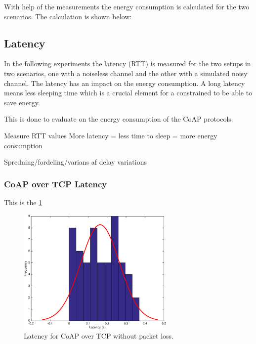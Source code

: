 With help of the measurements the energy consumption is calculated for the two scenarios. The calculation is shown below:

\subsection{Latency}
In the following experiments the latency (RTT) is measured for the two setups in two scenarios, one with a noiseless channel and the other with a simulated noisy channel. The latency has an impact on the energy consumption. A long latency means less sleeping time which is a crucial element for a constrained to be able to save energy.
  
This is done to evaluate on the energy consumption of the CoAP protocols. 

Measure RTT values %
More latency = less time to sleep = more energy consumption

Spredning/fordeling/varians af delay variations 

\subsubsection{CoAP over TCP Latency}
This is the \figurename \ref{fig_sim}
\begin{figure}[bh]
\centering
\includegraphics[width=3in]{gfx/coapovertcp}
\caption{Latency for CoAP over TCP without packet loss.}
\label{fig_sim}
\end{figure}

